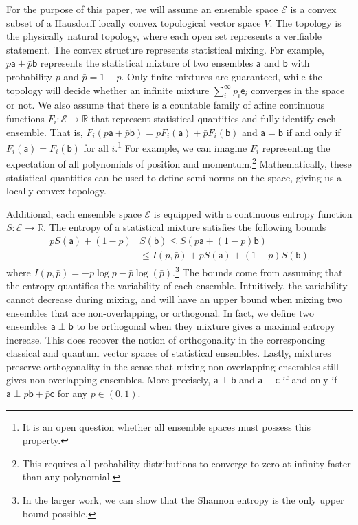 \documentclass[10pt,twocolumn, nofootinbib]{revtex4-2}
\newcommand{\ens}[1][e] {\mathsf{#1}} %
\newcommand{\Ens}[1][E] {\mathcal{#1}} %
\def\ortho{\perp}
\begin{document}
For the purpose of this paper, we will assume an ensemble space $\Ens$ is a convex subset of a Hausdorff locally convex topological vector space $V$. The topology is the physically natural topology, where each open set represents a verifiable statement. The convex structure represents statistical mixing. For example, $p \ens[a] + \bar{p} \ens[b]$ represents the statistical mixture of two ensembles $\ens[a]$ and $\ens[b]$ with probability $p$ and $\bar{p} = 1 - p$. Only finite mixtures are guaranteed, while the topology will decide whether an infinite mixture $\sum_{i}^{\infty} p_i \ens_i$ converges in the space or not. We also assume that there is a countable family of affine continuous functions $F_i : \Ens \to \mathbb{R}$ that represent statistical quantities and fully identify each ensemble. That is, $F_i(p \ens[a] + \bar{p} \ens[b]) = p F_i(\ens[a]) + \bar{p} F_i(\ens[b])$ and $\ens[a] = \ens[b]$ if and only if $F_i(\ens[a]) = F_i(\ens[b])$ for all $i$.\footnote{It is an open question whether all ensemble spaces must possess this property.} For example, we can imagine $F_i$ representing the expectation of all polynomials of position and momentum.\footnote{This requires all probability distributions to converge to zero at infinity faster than any polynomial.} Mathematically, these statistical quantities can be used to define semi-norms on the space, giving us a locally convex topology.

Additional, each ensemble space $\Ens$ is equipped with a continuous entropy function $S : \Ens \to \mathbb{R}$. The entropy of a statistical mixture satisfies the following bounds
\begin{equation}
	\begin{aligned}
		p S(\ens[a]) + (1-p) &S(\ens[b]) \leq S(p \ens[a] + (1-p) \ens[b]) \\
		&\leq I(p,\bar{p}) + p S(\ens[a]) + (1-p) S(\ens[b])
	\end{aligned}
\end{equation}
where $I(p,\bar{p}) = - p \log p - \bar{p} \log(\bar{p})$.\footnote{In the larger work, we can show that the Shannon entropy is the only upper bound possible.} The bounds come from assuming that the entropy quantifies the variability of each ensemble. Intuitively, the variability cannot decrease during mixing, and will have an upper bound when mixing two ensembles that are non-overlapping, or orthogonal. In fact, we define two ensembles $\ens[a] \ortho \ens[b]$ to be orthogonal when they mixture gives a maximal entropy increase. This does recover the notion of orthogonality in the corresponding classical and quantum vector spaces of statistical ensembles. Lastly, mixtures preserve orthogonality in the sense that mixing non-overlapping ensembles still gives non-overlapping ensembles. More precisely, $\ens[a] \ortho \ens[b]$ and $\ens[a] \ortho \ens[c]$ if and only if $\ens[a] \ortho p \ens[b] + \bar{p} \ens[c]$ for any $p \in (0,1)$.
\end{document}
